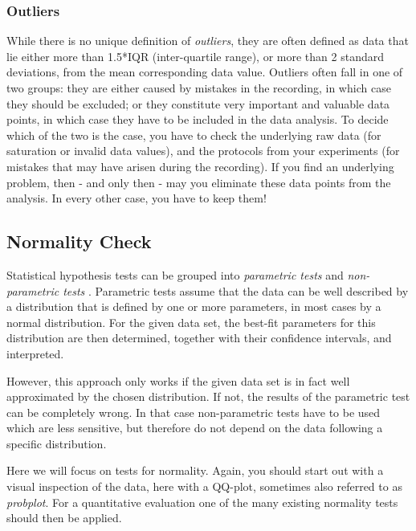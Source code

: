 \subsubsection{Outliers} 

While there is no unique definition of \emph{outliers}, they are often defined as data that lie either more than 1.5*IQR (inter-quartile range), or more than 2 standard deviations, from the mean corresponding data value. Outliers often fall in one of two groups: they are either caused by mistakes in the recording, in which case they should be excluded; or they constitute very important and valuable data points, in which case they have to be included in the data analysis. To decide which of the two is the case, you have to check the underlying raw data (for saturation or invalid data values), and the protocols from your experiments (for mistakes that may have arisen during the recording). If you find an underlying problem, then - and only then - may you eliminate these data points from the analysis. In every other case, you have to keep them!

\subsection{Normality Check} 

Statistical hypothesis tests can be grouped into \emph{parametric tests}  and \emph{non-parametric tests} . Parametric tests assume that the data can be well described by a distribution that is defined by one or more parameters, in most cases by a normal distribution. For the given data set, the best-fit parameters for this distribution are then determined, together with their confidence intervals, and interpreted.

However, this approach only works if the given data set is in fact well approximated by the chosen distribution. If not, the results of the parametric test can be completely wrong. In that case non-parametric tests have to be used which are less sensitive, but therefore do not depend on the data following a specific distribution.

Here we will focus on tests for normality. Again, you should start out with a visual inspection of the data, here with a QQ-plot, sometimes also referred to as \emph{probplot}. For a quantitative evaluation one of the many existing normality tests should then be applied.

